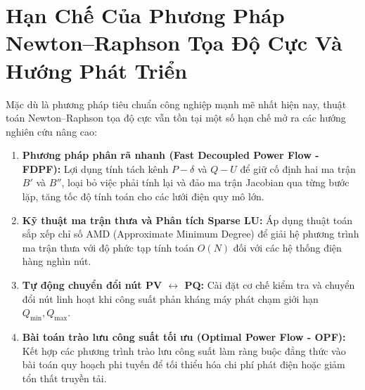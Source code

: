 \documentclass[12pt,a4paper,oneside]{report}
\begin{document}
\section{Hạn Chế Của Phương Pháp Newton--Raphson Tọa Độ Cực Và Hướng Phát Triển}
Mặc dù là phương pháp tiêu chuẩn công nghiệp mạnh mẽ nhất hiện nay, thuật toán Newton--Raphson tọa độ cực vẫn tồn tại một số hạn chế mở ra các hướng nghiên cứu nâng cao:
\begin{enumerate}
    \item \textbf{Phương pháp phân rã nhanh (Fast Decoupled Power Flow - FDPF):} Lợi dụng tính tách kênh $P-\delta$ và $Q-U$ để giữ cố định hai ma trận $B'$ và $B''$, loại bỏ việc phải tính lại và đảo ma trận Jacobian qua từng bước lặp, tăng tốc độ tính toán cho các lưới điện quy mô lớn.
    \item \textbf{Kỹ thuật ma trận thưa và Phân tích Sparse LU:} Áp dụng thuật toán sắp xếp chỉ số AMD (Approximate Minimum Degree) để giải hệ phương trình ma trận thưa với độ phức tạp tính toán $O(N)$ đối với các hệ thống điện hàng nghìn nút.
    \item \textbf{Tự động chuyển đổi nút PV $\leftrightarrow$ PQ:} Cài đặt cơ chế kiểm tra và chuyển đổi nút linh hoạt khi công suất phản kháng máy phát chạm giới hạn $Q_{\min}, Q_{\max}$.
    \item \textbf{Bài toán trào lưu công suất tối ưu (Optimal Power Flow - OPF):} Kết hợp các phương trình trào lưu công suất làm ràng buộc đẳng thức vào bài toán quy hoạch phi tuyến để tối thiểu hóa chi phí phát điện hoặc giảm tổn thất truyền tải.
\end{enumerate}
\end{document}

